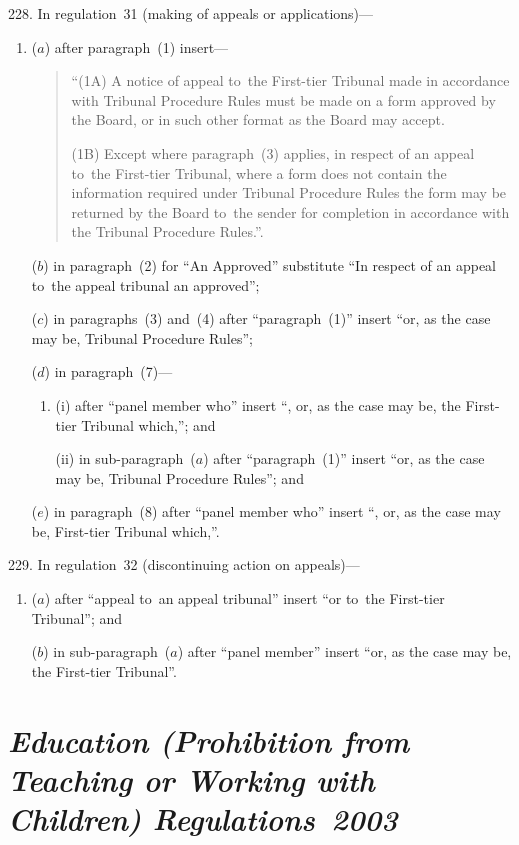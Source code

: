 \documentclass[12pt,a4paper]{article}
\begin{document}
228.  In regulation~31 (making of appeals or applications)—
\begin{enumerate}\item[]
($a$) after paragraph~(1) insert—
\begin{quotation}
“(1A) A notice of appeal to~the First-tier Tribunal made in accordance with Tribunal Procedure Rules must be made on a form approved by the Board, or in such other format as the Board may accept.

(1B) Except where paragraph~(3) applies, in respect of an appeal to~the First-tier Tribunal, where a form does not contain the information required under Tribunal Procedure Rules the form may be returned by the Board to~the sender for completion in accordance with the Tribunal Procedure Rules.”.
\end{quotation}

($b$) in paragraph~(2) for “An Approved” substitute “In respect of an appeal to~the appeal tribunal an approved”;

($c$) in paragraphs~(3) and~(4) after “paragraph~(1)” insert “or, as the case may be, Tribunal Procedure Rules”;

($d$) in paragraph~(7)—
\begin{enumerate}\item[]
(i) after “panel member who” insert “, or, as the case may be, the First-tier Tribunal which,”; and

(ii) in sub-paragraph~($a$)  after “paragraph~(1)” insert “or, as the case may be, Tribunal Procedure Rules”; and
\end{enumerate}

($e$) in paragraph~(8) after “panel member who” insert “, or, as the case may be, First-tier Tribunal which,”.
\end{enumerate}

\medskip

229.  In regulation~32 (discontinuing action on appeals)—
\begin{enumerate}\item[]
($a$) after “appeal to~an appeal tribunal” insert “or to~the First-tier Tribunal”; and

($b$) in sub-paragraph~($a$)  after “panel member” insert “or, as the case may be, the First-tier Tribunal”.
\end{enumerate}

\section*{\itshape\sloppy{} Education (Prohibition from Teaching or Working with Children) Regulations~2003}
\end{document}
